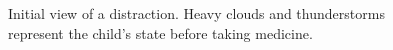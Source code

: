 \begin{figure}
\begin{minipage}[b]{0.46\linewidth}
	\caption[Distraction view from design workshop]{Initial view of a distraction. Heavy clouds and thunderstorms represent the child's state before taking medicine.}
	\label{fig:dwMediationViewCloudsThunderstorm}
	\end{minipage}
\end{figure}

% 

